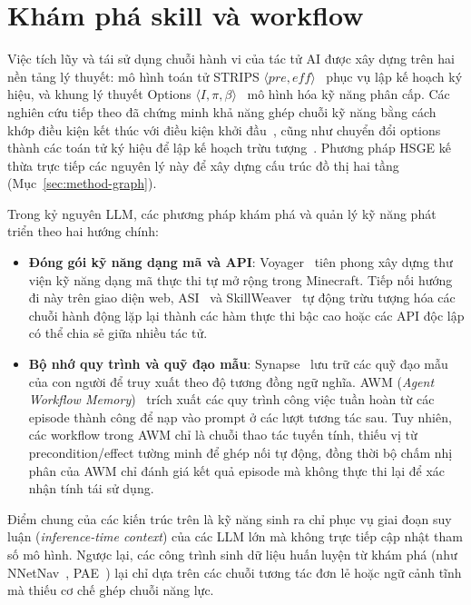 \section{Khám phá skill và workflow}
\label{sec:rel-skills}

Việc tích lũy và tái sử dụng chuỗi hành vi của tác tử AI được xây dựng trên hai nền tảng lý thuyết: mô hình toán tử STRIPS $\langle \mathit{pre}, \mathit{eff} \rangle$~\cite{fikes1971strips} phục vụ lập kế hoạch ký hiệu, và khung lý thuyết Options $\langle I, \pi, \beta \rangle$~\cite{sutton1999options} mô hình hóa kỹ năng phân cấp. Các nghiên cứu tiếp theo đã chứng minh khả năng ghép chuỗi kỹ năng bằng cách khớp điều kiện kết thúc với điều kiện khởi đầu~\cite{konidaris2009skillchaining}, cũng như chuyển đổi options thành các toán tử ký hiệu để lập kế hoạch trừu tượng~\cite{konidaris2018skills2symbols}. Phương pháp HSGE kế thừa trực tiếp các nguyên lý này để xây dựng cấu trúc đồ thị hai tầng (Mục~\ref{sec:method-graph}).

Trong kỷ nguyên LLM, các phương pháp khám phá và quản lý kỹ năng phát triển theo hai hướng chính:
\begin{itemize}
  \item \textbf{Đóng gói kỹ năng dạng mã và API}: Voyager~\cite{wang2024voyager} tiên phong xây dựng thư viện kỹ năng dạng mã thực thi tự mở rộng trong Minecraft. Tiếp nối hướng đi này trên giao diện web, ASI~\cite{wang2025asi} và SkillWeaver~\cite{zheng2025skillweaver} tự động trừu tượng hóa các chuỗi hành động lặp lại thành các hàm thực thi bậc cao hoặc các API độc lập có thể chia sẻ giữa nhiều tác tử.
  \item \textbf{Bộ nhớ quy trình và quỹ đạo mẫu}: Synapse~\cite{zheng2024synapse} lưu trữ các quỹ đạo mẫu của con người để truy xuất theo độ tương đồng ngữ nghĩa. AWM (\textit{Agent Workflow Memory})~\cite{wang2024awm} trích xuất các quy trình công việc tuần hoàn từ các episode thành công để nạp vào prompt ở các lượt tương tác sau. Tuy nhiên, các workflow trong AWM chỉ là chuỗi thao tác tuyến tính, thiếu vị từ precondition/effect tường minh để ghép nối tự động, đồng thời bộ chấm nhị phân của AWM chỉ đánh giá kết quả episode mà không thực thi lại để xác nhận tính tái sử dụng.
\end{itemize}

Điểm chung của các kiến trúc trên là kỹ năng sinh ra chỉ phục vụ giai đoạn suy luận (\textit{inference-time context}) của các LLM lớn mà không trực tiếp cập nhật tham số mô hình. Ngược lại, các công trình sinh dữ liệu huấn luyện từ khám phá (như NNetNav~\cite{murty2024nnetnav}, PAE~\cite{zhou2024pae}) lại chỉ dựa trên các chuỗi tương tác đơn lẻ hoặc ngữ cảnh tĩnh mà thiếu cơ chế ghép chuỗi năng lực. 

